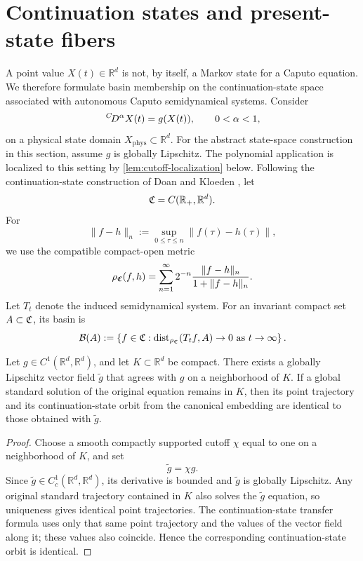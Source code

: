\section{Continuation states and present-state fibers}
\label{sec:state-space}

A point value \(X(t)\in\mathbb{R}^d\) is not, by itself, a Markov state for a Caputo equation. We therefore formulate basin membership on the continuation-state space associated with autonomous Caputo semidynamical systems. Consider
\begin{equation}
  \,{}^{C}\!D^{\alpha} X(t)=g(X(t)),
  \qquad 0<\alpha<1,
  \label{eq:caputo-general}
\end{equation}
on a physical state domain \(X_{\mathrm{phys}}\subset\mathbb{R}^d\). For the abstract state-space construction in this section, assume \(g\) is globally Lipschitz.  The polynomial application is localized to this setting by \cref{lem:cutoff-localization} below. Following the continuation-state construction of Doan and Kloeden
\cite{DoanKloeden2021Semidynamical,DoanKloeden2024Attractors}, let
\[
  \mathfrak{C}=C(\mathbb{R}_+,\mathbb{R}^d).
\]
For
\[
  \|f-h\|_n
  :=
  \sup_{0\le\tau\le n}\|f(\tau)-h(\tau)\|,
\]
we use the compatible compact-open metric
\begin{equation}
  \rho_{\mathfrak{C}}(f,h)
  =
  \sum_{n=1}^{\infty}
  2^{-n}
  \frac{\|f-h\|_n}{1+\|f-h\|_n}.
  \label{eq:compact-open-metric}
\end{equation}
Let \(T_t\) denote the induced semidynamical system.  For an invariant compact set \(A\subset\mathfrak{C}\), its basin is
\begin{equation}
  \mathcal{B}(A)
  :=
  \left\{
  f\in\mathfrak{C}:
  \operatorname{dist}_{\rho_{\mathfrak{C}}}(T_tf,A)\to0
  \text{ as }t\to\infty
  \right\}.
  \label{eq:basin-definition}
\end{equation}

\begin{lemma}
\label{lem:cutoff-localization}
Let \(g\in C^1(\mathbb R^d,\mathbb R^d)\), and let \(K\subset\mathbb R^d\) be compact.  There exists a globally Lipschitz vector field \(\widetilde g\) that agrees with \(g\) on a neighborhood of \(K\).  If a global standard solution of the original equation remains in \(K\), then its point trajectory and its continuation-state orbit from the canonical embedding are identical to those obtained with \(\widetilde g\).
\end{lemma}

\begin{proof}
Choose a smooth compactly supported cutoff \(\chi\) equal to one on a neighborhood of \(K\), and set
\[
  \widetilde g=\chi g.
\]
Since \(\widetilde g\in C^1_c(\mathbb R^d,\mathbb R^d)\), its derivative is bounded and \(\widetilde g\) is globally Lipschitz.  Any original standard trajectory contained in \(K\) also solves the \(\widetilde g\) equation, so uniqueness gives identical point trajectories.  The continuation-state transfer formula uses only that same point trajectory and the values of the vector field along it; these values also coincide.  Hence the corresponding continuation-state orbit is identical.
\end{proof}

